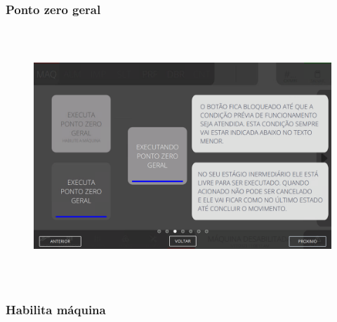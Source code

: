 \vspace*{\fill}

\newpage
\thispagestyle{fancy}

\vspace*{40 pt}

\subsubsection{\small{Ponto zero geral}}\label{telaComandosMaquinaPontoZeroGeral}

\vspace*{\fill}

\begin{figure}[h]
  \centering
  \includegraphics[width=576px,height=360px]{src/imagesFlexo/02-machine/e-3.png}
\end{figure}

\vspace*{\fill}

\newpage
\thispagestyle{fancy}

\vspace*{40 pt}

\subsubsection{\small{Habilita máquina}}\label{telaComandosMaquinaHabilitaMaquina}

\vspace*{\fill}

